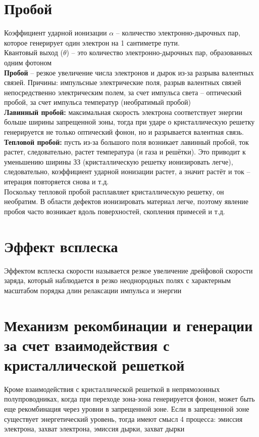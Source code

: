 \begin{multicols*}{2}
		\section{Пробой}
		Коэффициент ударной ионизации $\alpha$ – количество электронно-дырочных пар, которое генерирует один электрон на 1 сантиметре пути.\\
		Квантовый выход ($\theta$) – это количество электронно-дырочных пар, образованных одним фотоном\\
		\textbf{Пробой} – резкое увеличение числа электронов и дырок из-за разрыва валентных связей. Причины: импульсные электрические поля, разрыв валентных связей непосредственно электрическим полем, за счет импульса света – оптический пробой, за счет импульса температур (необратимый пробой)\\
		\textbf{Лавинный пробой:} максимальная скорость электрона соответствует энергии больше ширины запрещенной зоны,	тогда при ударе о кристаллическую решетку генерируется не только оптический фонон, но и	разрывается валентная связь.\\
		\textbf{Тепловой пробой:} пусть из-за большого поля возникает лавинный пробой, ток растет, следовательно, растет температура (и газа и решётки). Это приводит к уменьшению ширины ЗЗ (кристаллическую решетку ионизировать легче), следовательно, коэффициент ударной ионизации растет, а значит растёт и ток – итерация повторяется снова и т.д.\\
		Поскольку тепловой пробой расплавляет кристаллическую решетку, он необратим. В области дефектов ионизировать материал легче, поэтому явление пробоя часто возникает вдоль поверхностей, скопления примесей и т.д.

		\section{Эффект всплеска}
		Эффектом всплеска скорости называется резкое увеличение дрейфовой скорости заряда, который наблюдается в резко неоднородных полях с характерным масштабом порядка длин релаксации импульса и энергии

		\section{Механизм рекомбинации и генерации за счет взаимодействия с кристаллической решеткой}
		Кроме взаимодействия с кристаллической решеткой в непрямозонных полупроводниках, когда при переходе зона-зона генерируется фонон, может быть еще рекомбинация через уровни в запрещенной зоне. Если в запрещенной зоне существует энергетический уровень, тогда имеют смысл 4 процесса: эмиссия электрона, захват электрона, эмиссия дырки, захват дырки

	\end{multicols*}

